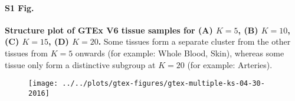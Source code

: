\documentclass[10pt,letterpaper]{article}
\begin{document}
\paragraph{S1 Fig.}
\label{figS1}
{\bf Structure plot of GTEx V6 tissue samples for (A) $K=5$, (B) $K=10$, (C) $K=15$, (D) $K=20$.} Some tissues form a separate cluster from the other tissues from $K=5$ onwards (for example: Whole Blood, Skin), whereas some tissue only form a distinctive subgroup at $K=20$ (for example: Arteries).
\begin{figure}[ht]
\centering
\texttt{[image: ../../plots/gtex-figures/gtex-multiple-ks-04-30-2016]}
\end{figure}
\end{document}
